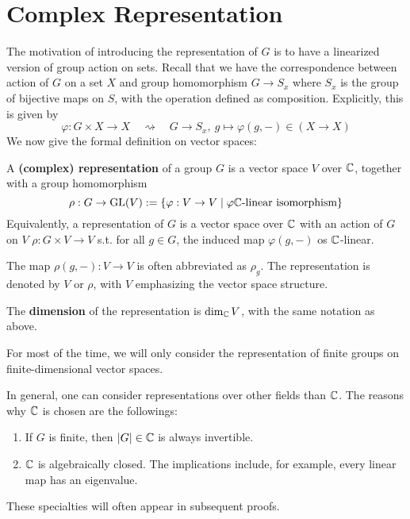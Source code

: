 \documentclass{article}
\begin{document}

\tableofcontents
\newpage

\section{Complex Representation}

\vspace*{-1em}
The motivation of introducing the representation of $G$ is to have a linearized version of group action on sets. Recall that we have the correspondence between action of $G$ on a set $X$ and group homomorphism $G \to S_x$ where $S_x$ is the group of bijective maps on $S$, with the operation defined as composition. Explicitly, this is given by
\[
    \varphi: G \times X \to X \quad \rightsquigarrow \quad G \to S_x,\ g \mapsto \varphi(g, -) \in (X \to X) 
\]
We now give the formal definition on vector spaces:

\begin{definition}[Representation]
    A \textbf{(complex) representation} of a group $G$ is a vector space $V$ over $\mathbb{C}$, together with a group homomorphism 
    \[
        \rho: G \to \mathrm{GL}(V) := \{ \varphi: V \to V \mid \varphi \text{$\mathbb{C}$-linear isomorphism} \}
    \]
    Equivalently, a representation of $G$ is a vector space over $\mathbb{C}$ with an action of $G$ on $V$ $\rho: G \times V \to V$ s.t. for all $g \in G$, the induced map $\varphi(g, -)$ os $\mathbb{C}$-linear.
\end{definition}

\begin{notation}
    The map $\rho(g, -): V \to V$ is often abbreviated as $\rho_g$. The representation is denoted by $V$ or $\rho$, with $V$ emphasizing the vector space structure.
\end{notation}

\begin{definition}
    The \textbf{dimension} of the representation is $\dim_{\mathbb{C}}V$, with the same notation as above. 
\end{definition}

For most of the time, we will only consider the representation of finite groups on finite-dimensional vector spaces.

\begin{remark}
    In general, one can consider representations over other fields than $\mathbb{C}$. The reasons why $\mathbb{C}$ is chosen are the followings:
    \begin{enumerate}[label=\arabic*)]
        \item If $G$ is finite, then $\left|G\right| \in \mathbb{C}$ is always invertible.
        \item $\mathbb{C}$ is algebraically closed. The implications include, for example, every linear map has an eigenvalue.
    \end{enumerate}
    These specialties will often appear in subsequent proofs. 
\end{remark}
\end{document}
